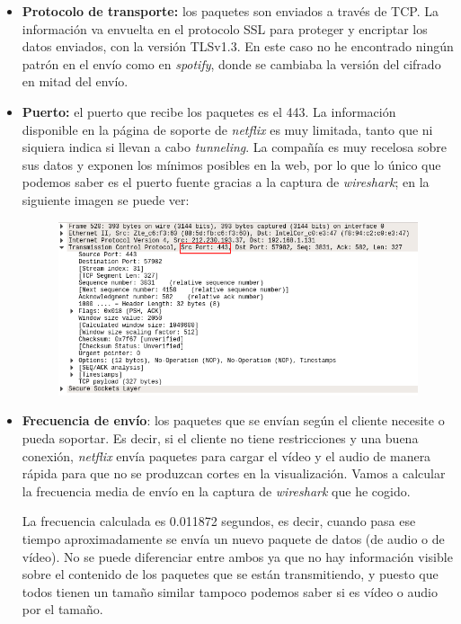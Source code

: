 \documentclass[11pt,a4paper]{article}
\begin{document}
\begin{itemize}
	\item \textbf{Protocolo de transporte:} los paquetes son enviados a través de TCP. La información va envuelta en el protocolo SSL para proteger y encriptar los datos enviados, con la versión TLSv1.3. En este caso no he encontrado ningún patrón en el envío como en \textit{spotify}, donde se cambiaba la versión del cifrado en mitad del envío.
	
	\item \textbf{Puerto:} el puerto que recibe los paquetes es el 443. La información disponible en la página de soporte de \textit{netflix} es muy limitada, tanto que ni siquiera indica si llevan a cabo \textit{tunneling}. La compañía es muy recelosa sobre sus datos y exponen los mínimos posibles en la web, por lo que lo único que podemos saber es el puerto fuente gracias a la captura de \textit{wireshark}; en la siguiente imagen se puede ver:
	
	\begin{figure}[H]
		\centering
		\includegraphics[scale=0.5]{img/puerto-netflix.png}
	\end{figure}
	
	\item \textbf{Frecuencia de envío}: los paquetes que se envían según el cliente necesite o pueda soportar. Es decir, si el cliente no tiene restricciones y una buena conexión, \textit{netflix} envía paquetes para cargar el vídeo y el audio de manera rápida para que no se produzcan cortes en la visualización. Vamos a calcular la frecuencia media de envío en la captura de \textit{wireshark} que he cogido.
	
	La frecuencia calculada es 0.011872 segundos, es decir, cuando pasa ese tiempo aproximadamente se envía un nuevo paquete de datos (de audio o de vídeo). No se puede diferenciar entre ambos ya que no hay información visible sobre el contenido de los paquetes que se están transmitiendo, y puesto que todos tienen un tamaño similar tampoco podemos saber si es vídeo o audio por el tamaño.
	

\end{itemize}
\end{document}
